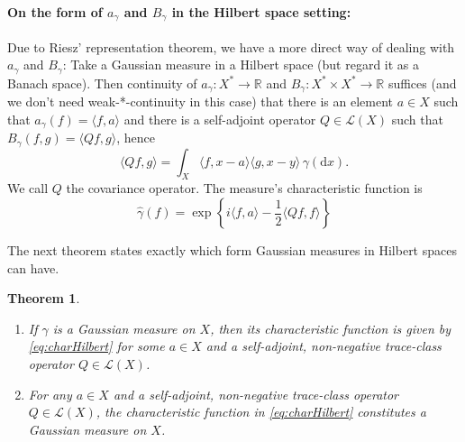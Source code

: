 \documentclass{scrartcl}
\newtheorem{theorem}{Theorem}
\theoremstyle{definition}
\theoremstyle{remark}
\newcommand{\de}{\mathrm d}
\newcommand{\R}{\mathbb R}
\begin{document}
{\paragraph{On the form of $a_\gamma$ and $B_\gamma$ in the Hilbert space setting:} Due to Riesz' representation theorem, we have a more direct way of dealing with $a_\gamma$ and $B_\gamma$: Take a Gaussian measure in a Hilbert space (but regard it as a Banach space). Then continuity of $a_\gamma : X^*\to \R$ and $B_\gamma: X^*\times X^*\to \R$ suffices (and we don't need weak-*-continuity in this case) that there is an element $a\in X$ such that $a_\gamma(f) = \langle f, a\rangle$ and there is a self-adjoint operator $Q\in\mathcal L(X)$ such that $B_\gamma(f,g) = \langle Q f, g\rangle$, hence
\begin{displaymath}
\langle Qf, g\rangle = \int_X \langle f, x-a\rangle \langle g, x-y\rangle \, \gamma(\de x).
\end{displaymath} 
We call $Q$ the covariance operator. The measure's characteristic function is
\begin{equation}\label{eq:charHilbert}
\hat \gamma(f) = \exp\left\{i\langle f, a\rangle - \frac{1}{2}\langle Qf, f\rangle\right\}
\end{equation}


The next theorem states exactly which form Gaussian measures in Hilbert spaces can have.

\begin{theorem}
\begin{enumerate}
\item If $\gamma$ is a Gaussian measure on $X$, then its characteristic function is given by \eqref{eq:charHilbert} for some $a\in X$ and a self-adjoint, non-negative trace-class operator $Q\in \mathcal L(X)$.
\item For any $a\in X$ and a self-adjoint, non-negative trace-class operator $Q\in \mathcal L(X)$, the characteristic function in \eqref{eq:charHilbert} constitutes a Gaussian measure on $X$.
\end{enumerate}
\end{theorem}

}
\end{document}
